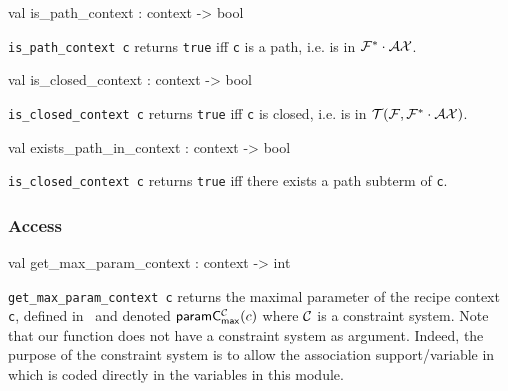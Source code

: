 \label{val:Recipe.is-underscorepath-underscorecontext}\begin{ocamldoccode}
val is_path_context : context -> bool
\end{ocamldoccode}
\begin{ocamldocdescription}
{\tt{is\_path\_context c}} returns {\tt{true}} iff {\tt{c}} is a path, i.e. is in $\mathcal{F}^* \cdot \mathcal{AX}$. 


\end{ocamldocdescription}




\label{val:Recipe.is-underscoreclosed-underscorecontext}\begin{ocamldoccode}
val is_closed_context : context -> bool
\end{ocamldoccode}
\begin{ocamldocdescription}
{\tt{is\_closed\_context c}} returns {\tt{true}} iff {\tt{c}} is closed, i.e. is in $\mathcal{T}(\mathcal{F},\mathcal{F}^* \cdot \mathcal{AX})$. 


\end{ocamldocdescription}




\label{val:Recipe.exists-underscorepath-underscorein-underscorecontext}\begin{ocamldoccode}
val exists_path_in_context : context -> bool
\end{ocamldoccode}
\begin{ocamldocdescription}
{\tt{is\_closed\_context c}} returns {\tt{true}} iff there exists a path subterm of {\tt{c}}.


\end{ocamldocdescription}




\subsubsection{Access}




\label{val:Recipe.get-underscoremax-underscoreparam-underscorecontext}\begin{ocamldoccode}
val get_max_param_context : context -> int
\end{ocamldoccode}
\begin{ocamldocdescription}
{\tt{get\_max\_param\_context c}} returns the maximal parameter of the recipe context {\tt{c}}, defined in~
    and denoted $\mathsf{paramC^{\mathcal{C}}_{max}}(c)$ where $\mathcal{C}$ is a constraint system.  Note that our function does not have 
    a constraint system as argument. Indeed, the purpose of the constraint system is to allow the association support/variable
    in~\thesis~ which is coded directly in the variables in this module.


\end{ocamldocdescription}




